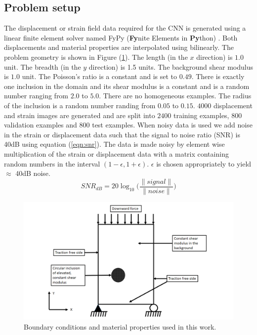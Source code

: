 \documentclass[12pt]{article}
\begin{document}
\subsection{\label{sect:probsetup}Problem setup}
The displacement or strain field data required for the CNN is generated using a linear finite element solver named FyPy (\textbf{Fy}nite Elements in \textbf{Py}thon) \cite{misc:fypy}. Both displacements and material properties are interpolated using bilinearly. The problem geometry is shown in Figure (\ref{fig:bc}). The length (in the $x$ direction) is $1.0$ unit. The breadth (in the $y$ direction) is 1.5 units. The background shear modulus is $1.0$ unit. The Poisson's ratio is a constant and is set to $0.49$. There is exactly one inclusion in the domain and its shear modulus is a constant and is a random number ranging from $2.0$ to $5.0$. There are no homogeneous examples. The radius of the inclusion is a random number randing from $0.05$ to $0.15$. $4000$ displacement and strain images are generated and are split into $2400$ training examples, $800$ validation examples and $800$ test examples. When noisy data is used we add noise in the strain or displacement data such that the signal to noise ratio (SNR) is 40dB using equation (\ref{eqn:snr}). The data is made noisy by element wise multiplication of the strain or displacement data with a matrix containing random numbers in the interval $(1-\epsilon,1+\epsilon)$. $\epsilon$ is chosen appropriately to yield $\approx$ 40dB noise.
\begin{equation}
  \label{eqn:snr}
  SNR_{dB} = 20\log_{10}\Big(\frac{\|signal\|}{\|noise\|}\Big)
\end{equation}
%
\begin{figure} 
   \centering
    \includegraphics[totalheight=9cm]{Figures/bc.png}
  \caption{\label{fig:bc}Boundary conditions and material properties used in this work. }
\end{figure}
%
\end{document}
